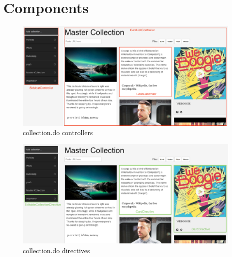 \section{Components}

\begin{figure}[htb]
  \centerline{
    \includegraphics[width=\linewidth]{images/collection-controllers.png}
  }
  \caption[collection.do controllers]{collection.do controllers}
  \label{fig:collection-controllers}
\end{figure}

\begin{figure}[htb]
  \centerline{
    \includegraphics[width=\linewidth]{images/collection-directives.png}
  }
  \caption[collection.do directives]{collection.do directives}
  \label{fig:collection-directives}
\end{figure}